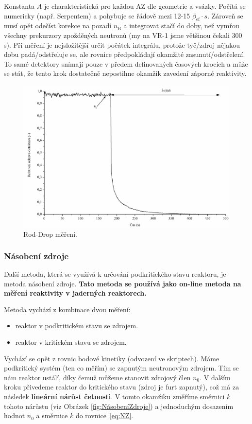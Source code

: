 Konstanta $A$ je charakteristická pro každou AZ dle geometrie a vsázky. Počítá se numericky (např. Serpentem) a pohybuje se řádově mezi 12-15 $\beta_\text{ef}\cdot s$. Zároveň se musí opět odečíst korekce na pozadí $n_\text{B}$ a integrovat stačí do doby, než vymřou všechny prekurzory zpožděných neutronů (my na VR-1 jsme většinou čekali 300 s). Při měření je nejsložitější určit počátek integrálu, protože tyč/zdroj nějakou dobu padá/odstřeluje se, ale rovnice předpokládají okamžité zasunutí/odstřelení. To samé detektory snímají pouze v předem definovaných časových krocích a může se stát, že tento krok dostatečně nepostihne okamžik zavedení záporné reaktivity.

\begin{figure}[H]
    \centering
    \includegraphics[scale=0.3]{img/RodDrop.png}
    \caption{Rod-Drop měření.}
    \label{fig:Rod-Drop}
\end{figure}

\subsubsection{Násobení zdroje}

Další metoda, která se využívá k určování podkritického stavu reaktoru, je metoda násobení zdroje. \textbf{Tato metoda se používá jako on-line metoda na měření reaktivity v jaderných reaktorech.}

Metoda vychází z kombinace dvou měření:
\begin{itemize}
    \item reaktor v podkritickém stavu se zdrojem.
    \item reaktor v kritickém stavu se zdrojem.    
\end{itemize}
Vychází se opět z rovnic bodové kinetiky (odvození ve skriptech). Máme podkritický systém (ten co měřím) se zapnutým neutronovým zdrojem. Tím se nám reaktor ustálí, díky čemuž můžeme stanovit zdrojový člen $n_0$. V dalším kroku přivedeme reaktor do kritického stavu (zdroj je furt zapnutý), což má za následek \textbf{lineární nárůst četnosti}. V tomto okamžiku změříme směrnici $k$ tohoto nárůstu (viz Obrázek \ref{fig:NásobeníZdroje}) a jednoduchým dosazením hodnot $n_0$ a směrnice $k$ do rovnice~\eqref{eq:NZ}. 

